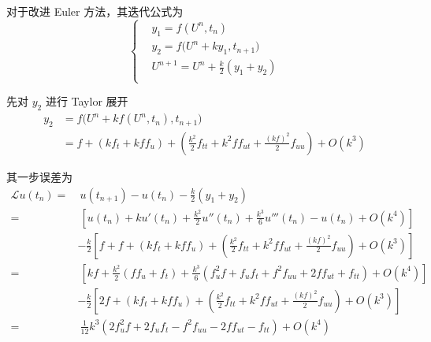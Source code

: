 \documentclass[a4paper]{article}
\begin{document}
\par 对于改进 Euler 方法，其迭代公式为
\begin{equation}
    \left\{
        \begin{aligned}
            &y_1 = f(U^n,t_n) \\
            &y_2 = f\Big(U^n+ky_1,t_{n+1}\Big) \\
            &U^{n+1} = U^n + \frac{k}{2}(y_1+y_2) \\
        \end{aligned}
    \right.
\end{equation}
\par 先对 $y_2$ 进行 Taylor 展开
\begin{equation}
    \begin{aligned}
        y_2 &= f\Big(U^n+kf(U^n,t_n),t_{n+1}\Big) \\
        &= f 
        + \left(kf_t + kf f_u\right)
        + \left(
            \frac{k^2}{2} f_{tt} + k^2f f_{ut} + \frac{(kf)^2}{2}  f_{uu}
        \right) + O(k^3)
    \end{aligned}
\end{equation} 
\par 其一步误差为
\begin{equation}
    \begin{aligned}
        \mathcal{L}u(t_n)
        =&\ u(t_{n+1}) - u(t_n) - \frac{k}{2}\left(
            y_1+y_2
        \right) \\
        =&\ \left[
            u(t_n) +ku'(t_n)+\frac{k^2}{2}u''(t_n)+\frac{k^3}{6}u'''(t_n) - u(t_n) + O(k^4)
        \right]  \\
        &- \frac{k}{2}\left[
            f+f 
        + \left(kf_t + kf f_u\right)
        + \left(
            \frac{k^2}{2} f_{tt} + k^2f f_{ut} + \frac{(kf)^2}{2}  f_{uu}
        \right) + O(k^3)
        \right]\\
        =&\ \left[
            kf+\frac{k^2}{2}\left(ff_u+f_t\right)+\frac{k^3}{6}\left(
                f^2_uf+f_uf_t+f^2f_{uu}+2ff_{ut}+f_{tt}
            \right) + O(k^4)
        \right]  \\
        &- \frac{k}{2}\left[
            2f
        + \left(kf_t + kf f_u\right)
        + \left(
            \frac{k^2}{2} f_{tt} + k^2f f_{ut} + \frac{(kf)^2}{2}  f_{uu}
        \right) + O(k^3)
        \right]\\
        =&\ \frac{1}{12}k^3\left(
            2f^2_uf+2f_uf_t-f^2f_{uu}-2ff_{ut}-f_{tt}
        \right) + O(k^4)
    \end{aligned}
\end{equation}
\end{document}
